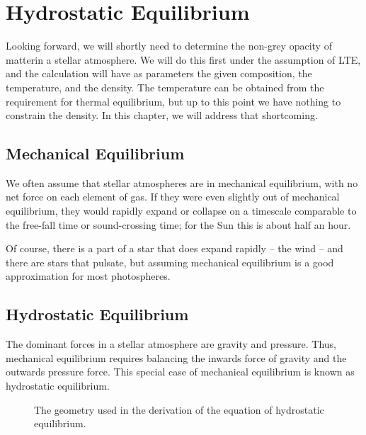 
\chapter{Hydrostatic Equilibrium}

Looking forward, we will shortly need to determine the non-grey opacity of matterin a stellar atmosphere. We will do this first under the assumption of LTE, and the calculation will have as parameters the given composition, the temperature, and the density. The temperature can be obtained from the requirement for thermal equilibrium, but up to this point we have nothing to constrain the density. In this chapter, we will address that shortcoming.

\newslide

\section{Mechanical Equilibrium}

We often assume that stellar atmospheres are in mechanical equilibrium, with no net force on each element of gas. If they were even slightly out of mechanical equilibrium, they would rapidly expand or collapse on a timescale comparable to the free-fall time or sound-crossing time; for the Sun this is about half an hour.

Of course, there is a part of a star that does expand rapidly -- the wind -- and there are stars that pulsate, but assuming mechanical equilibrium is a good approximation for most photospheres.

\newslide

\section{Hydrostatic Equilibrium}

The dominant forces in a stellar atmosphere are gravity and pressure. Thus, mechanical equilibrium requires balancing the inwards force of gravity and the outwards pressure force. This special case of mechanical equilibrium is known as hydrostatic equilibrium.

\begin{figure}
\begin{center}
\end{center}
\caption{The geometry used in the derivation of the equation of hydrostatic equilibrium.}
\label{fig-hydrostatic-equilibrium}
\end{figure}

